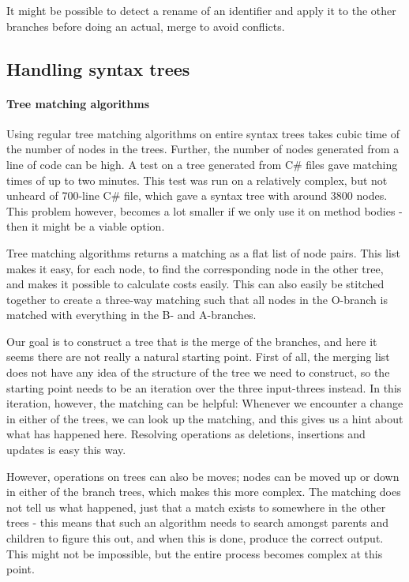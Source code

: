 \documentclass[11pt]{article}
\begin{document}
It might be possible to detect a rename of an identifier and apply it to the other branches before doing an actual, merge to avoid conflicts.

\subsection{Handling syntax trees}
\paragraph{Tree matching algorithms} Using regular tree matching algorithms on entire syntax trees takes cubic time of the number of nodes in the trees. Further, the number of nodes generated from a line of code can be high. A test on a tree generated from C\# files gave matching times of up to two minutes. This test was run on a relatively complex, but not unheard of 700-line C\# file, which gave a syntax tree with around 3800 nodes. This problem however, becomes a lot smaller if we only use it on method bodies - then it might be a viable option.

Tree matching algorithms returns a matching as a flat list of node pairs. This list makes it easy, for each node, to find the corresponding node in the other tree, and makes it possible to calculate costs easily. This can also easily be stitched together to create a three-way matching such that all nodes in the O-branch is matched with everything in the B- and A-branches.

Our goal is to construct a tree that is the merge of the branches, and here it seems there are not really a natural starting point. First of all, the merging list does not have any idea of the structure of the tree we need to construct, so the starting point needs to be an iteration over the three input-threes instead. In this iteration, however, the matching can be helpful: Whenever we encounter a change in either of the trees, we can look up the matching, and this gives us a hint about what has happened here. Resolving operations as deletions, insertions and updates is easy this way.

However, operations on trees can also be moves; nodes can be moved up or down in either of the branch trees, which makes this more complex. The matching does not tell us what happened, just that a match exists to somewhere in the other trees - this means that such an algorithm needs to search amongst parents and children to figure this out, and when this is done, produce the correct output. This might not be impossible, but the entire process becomes complex at this point. 
\end{document}
